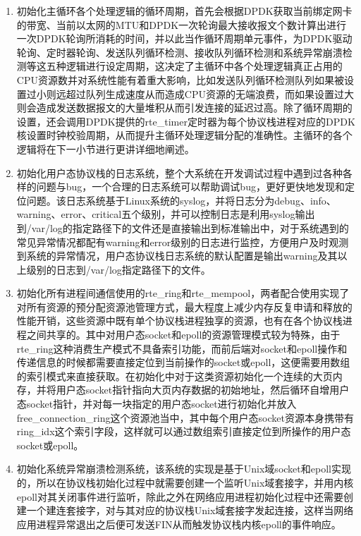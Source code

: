 \begin{enumerate}[(1),labelsep=.5em, leftmargin = 0pt, itemindent = 3em]
\item 初始化主循环各个处理逻辑的循环周期，首先会根据DPDK获取当前绑定网卡的带宽、当前以太网的MTU和DPDK一次轮询最大接收报文个数计算出进行一次DPDK轮询所消耗的时间，并以此当作循环周期单元事件，为DPDK驱动轮询、定时器轮询、发送队列循环检测、接收队列循环检测和系统异常崩溃检测等这五种逻辑进行设定周期，这决定了主循环中各个处理逻辑真正占用的CPU资源数并对系统性能有着重大影响，比如发送队列循环检测队列如果被设置过小则远超过队列生成速度从而造成CPU资源的无端浪费，而如果设置过大则会造成发送数据报文的大量堆积从而引发连接的延迟过高。除了循环周期的设置，还会调用DPDK提供的rte\_timer定时器为每个协议栈进程对应的DPDK核设置时钟校验周期，从而提升主循环处理逻辑分配的准确性。主循环的各个逻辑将在下一小节进行更讲详细地阐述。
\item 初始化用户态协议栈的日志系统，整个大系统在开发调试过程中遇到过各种各样的问题与bug，一个合理的日志系统可以帮助调试bug，更好更快地发现和定位问题。该日志系统基于Linux系统的syslog，并将日志分为debug、info、warning、error、critical五个级别，并可以控制日志是利用syslog输出到/var/log的指定路径下的文件还是直接输出到标准输出中，对于系统遇到的常见异常情况都配有warning和error级别的日志进行监控，方便用户及时观测到系统的异常情况，用户态协议栈日志系统的默认配置是输出warning及其以上级别的日志到/var/log指定路径下的文件。
\item 初始化所有进程间通信使用的rte\_ring和rte\_mempool，两者配合使用实现了对所有资源的预分配资源池管理方式，最大程度上减少内存反复申请和释放的性能开销，这些资源中既有单个协议栈进程独享的资源，也有在各个协议栈进程之间共享的。其中对用户态socket和epoll的资源管理模式较为特殊，由于rte\_ring这种消费生产模式不具备索引功能，而前后端对socket和epoll操作和传递信息的时候都需要直接定位到当前操作的socket或epoll，这便需要用数组的索引模式来直接获取。在初始化中对于这类资源初始化一个连续的大页内存，并将用户态socket指针指向大页内存数据的初始地址，然后循环自增用户态socket指针，并对每一块指定的用户态socket进行初始化并放入free\_connection\_ring这个资源池当中，其中每个用户态socket资源本身携带有ring\_idx这个索引字段，这样就可以通过数组索引直接定位到所操作的用户态socket或epoll。
\item 初始化系统异常崩溃检测系统，该系统的实现是基于Unix域socket和epoll实现的，所以在协议栈初始化过程中就需要创建一个监听Unix域套接字，并用内核epoll对其关闭事件进行监听，除此之外在网络应用进程初始化过程中还需要创建一个建连套接字，对与其对应的协议栈Unix域套接字发起连接，这样当网络应用进程异常退出之后便可发送FIN从而触发协议栈内核epoll的事件响应。
\end{enumerate}

